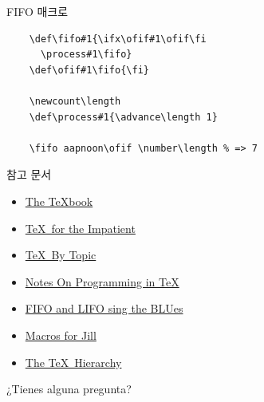 \documentclass{beamer}
\begin{document}
%
\begin{frame}[fragile]{FIFO 매크로}
  \begin{verbatim}
    \def\fifo#1{\ifx\ofif#1\ofif\fi
      \process#1\fifo}
    \def\ofif#1\fifo{\fi}

    \newcount\length
    \def\process#1{\advance\length 1}

    \fifo aapnoon\ofif \number\length % => 7
  \end{verbatim}
\end{frame}


%
\begin{frame}{참고 문서}
  \begin{itemize}
  \item \href{http://ftp.ktug.org/tex-archive/systems/knuth/dist/tex/}
    {The \TeX book}
  \item \href{http://ftp.ktug.org/tex-archive/info/impatient/book.pdf}
    {\TeX\ for the Impatient}
  \item \href{http://ftp.ktug.org/tex-archive/info/texbytopic/TeXbyTopic.pdf}
    {\TeX\ By Topic}
  \item \href{http://pgfplots.sourceforge.net/TeX-programming-notes.pdf}
    {Notes On Programming in TeX}
  \item \href{https://www.tug.org/TUGboat/tb14-1/tb38laan.pdf}
    {FIFO and LIFO sing the BLUes}
  \item \href{https://www.tug.org/TUGboat/tb08-3/tb19knut.pdf}
    {Macros for Jill}
  \item \href{https://www.tug.org/TUGboat/tb15-1/tb42arseneau.pdf}
    {The TeX\ Hierarchy}
  \end{itemize}
\end{frame}


%
\begin{frame}[standout]
  ¿Tienes alguna pregunta?
\end{frame}
\end{document}
